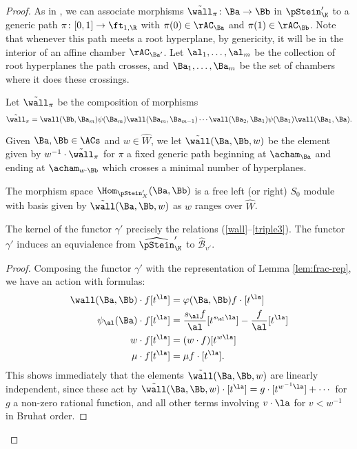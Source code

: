 \begin{proof}
As in \cite[Def. 2.12]{WebSD}, we can associate morphisms
$\tilde{\wall}_\pi\colon \Ba\to \Bb$
in $\pStein_\K'$ to a generic path $\pi\colon [0,1]\to\ft_{1,\R}$
with $\pi(0)\in \rAC_{\Ba}$ and $\pi(1)\in \rAC_{\Bb}$.   Note that
whenever this path meets a root hyperplane, by genericity, it will be
in the interior of an affine chamber $\rAC_{\Ba'}$.  Let $\al_1,\dots,
\al_m$ be the collection of root hyperplanes the path crosses, and 
$\Ba_1,\dots, \Ba_m$ be the set of chambers where it does these
crossings.  
\begin{definition}
  Let $\tilde{\wall}_\pi$ be the composition of morphisms 
\[\tilde{\wall}_\pi=\wall(\Bb,\Ba_m) \psi(\Ba_m)\wall (\Ba_{m},\Ba_{m-1})\cdots \wall(\Ba_2,\Ba_1) \psi(\Ba_1)\wall (\Ba_{1},\Ba).\]
\end{definition}

Given
$\Ba,\Bb\in \ACs$ and  $w\in \widehat{W}$, we let
$\tilde{\wall}(\Ba,\Bb,w)$ be the element given by $w^{-1}\cdot
\tilde{\wall}_\pi$ for $\pi$ a fixed generic path beginning at
$\acham_{\Ba}$ and ending at $\acham_{w\cdot \Bb}$ which crosses a
minimal number of hyperplanes.


  \begin{proposition}\label{prop:pStein-basis}
The morphism space $\Hom_{\pStein_X' }(\Ba,\Bb)$ is a free left (or
right) $S_0$ module with basis given by $\tilde{\wall}(\Ba,\Bb,w)$ as
$w$ ranges over $\widehat{W}$.  

    The kernel of the functor $\gamma'$ precisely the relations
    (\ref{wall}--\ref{triple3}).  
  The functor $\gamma'$ induces an equvialence from
  $\widehat{\pStein}_\K'$ to
  $\widehat{\mathscr{B}}_{\upsilon'}$.
  \end{proposition}

\begin{proof}
Composing the functor $\gamma'$ with the representation of Lemma
\ref{lem:frac-rep}, we have an action with formulas:
\begin{align}
\wall(\Ba,\Bb)\cdot f [t^\la]&=\varphi(\Ba,\Bb) f\cdot
                                           [t^\la]\nonumber\\
\label{eq:Y-act-frac}\psi_\al(\Ba) \cdot f [t^\la]&=\frac{s_{\al}f}{\al}[t^{s_{\al}\la}]-\frac{f}{\al}[t^{\la}]\\
w\cdot f[t^\la]&=(w\cdot f)[t^{w\la}]\nonumber\\
\mu \cdot f [t^\la]&=\mu f\cdot [t^\la]. \nonumber
  \end{align} 
This shows immediately that the elements $\tilde{\wall}(\Ba,\Bb,w)$
are linearly independent, since these act by $\tilde{\wall}(\Ba,\Bb,w)\cdot
[t^\la]=g\cdot [t^{w^{-1}\la}]+\cdots$ for $g$ a non-zero rational
function, and all other terms involving $v\cdot \la$ for $v<w^{-1}$ in
Bruhat order.  


\end{proof}
\end{proof}
